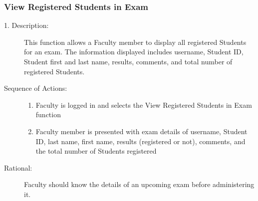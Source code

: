    \subsubsection{\large View Registered Students in Exam} 
   \begin{boxed} %
      \begin{description}
         \item[1. Description:\label{desc:view_registered}]
      This function allows a Faculty member to display all registered
         Students for an exam. The information displayed includes username,
         Student ID, Student first and last name, results, comments, and total number
         of registered Students. 
         
            \item[Sequence of Actions:]\hspace{10cm}
         \begin{enumerate}
            \item Faculty is logged in and selects the View Registered Students
               in Exam function
            \item Faculty member is presented with exam details of username,
               Student ID, last name, first name, results (registered or not),
               comments, and the total number of Students registered
         \end{enumerate}

            \item[Rational:]
         Faculty should know the details of an upcoming exam before
         administering it.
      \end{description}
   \end{boxed} %

